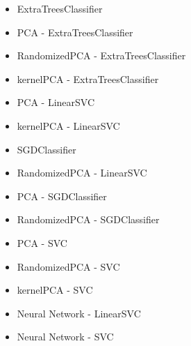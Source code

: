 \documentclass[a4paper, 11pt]{article}
\begin{document}
\begin{itemize}
\item ExtraTreesClassifier
\item PCA - ExtraTreesClassifier
\item RandomizedPCA - ExtraTreesClassifier
\item kernelPCA - ExtraTreesClassifier
\item PCA - LinearSVC
\item kernelPCA - LinearSVC
\item SGDClassifier
\item RandomizedPCA - LinearSVC
\item PCA - SGDClassifier
\item RandomizedPCA - SGDClassifier
\item PCA - SVC
\item RandomizedPCA - SVC
\item kernelPCA - SVC
\item Neural Network - LinearSVC
\item Neural Network - SVC

\end{itemize}
\end{document}
